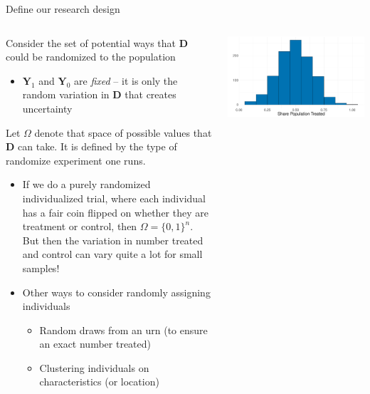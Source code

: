 \documentclass[notes,11pt, aspectratio=169]{beamer}
\newenvironment{wideitemize}{\itemize\addtolength{\itemsep}{10pt}}{\enditemize}
\begin{document}
\begin{frame}{Define our research design}
\begin{columns}[T] %
  \begin{column}{.7\textwidth}
  \begin{wideitemize}
  \item Consider the set of potential ways that $\mathbf{D}$ could be randomized to the population
    \begin{itemize}
    \item $\mathbf{Y}_{1}$ and $\mathbf{Y}_0$ are \emph{fixed} -- it
      is only the random variation in $\mathbf{D}$ that creates
      uncertainty
    \end{itemize}
  \item Let $\Omega$ denote that space of possible values that
      $\mathbf{D}$ can take. It is defined by the type of randomize
      experiment one runs.
      \begin{itemize}
      \item If we do a purely randomized individualized trial, where
        each individual has a fair coin flipped on whether they are
        treatment or control, then $\Omega = \{0,1\}^{n}$. But then
        the variation in number treated and control can vary quite a
        lot for small samples!
      \item Other ways to consider randomly assigning individuals
        \begin{itemize}
        \item Random draws from an urn (to ensure an exact number treated)
        \item Clustering individuals on characteristics (or location)
        \end{itemize}
      \end{itemize}
    \end{wideitemize}
  \end{column}%
  \hfill%
  \begin{column}{.4\textwidth}
    \includegraphics[width=\linewidth]{images/randomized1.pdf}
  \end{column}%
\end{columns}
\end{frame}
\end{document}
